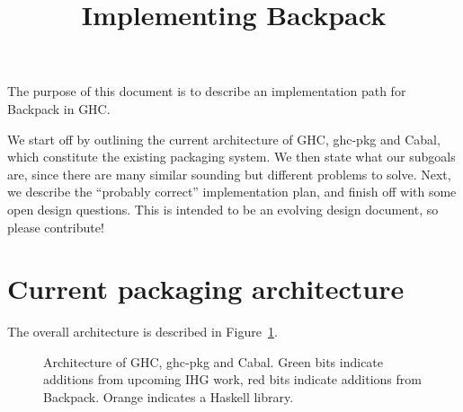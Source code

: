 \documentclass{article}
\title{Implementing Backpack}
\begin{document}
\maketitle

The purpose of this document is to describe an implementation path
for Backpack in GHC\@.

We start off by outlining the current architecture of GHC, ghc-pkg and Cabal,
which constitute the existing packaging system.  We then state what our subgoals
are, since there are many similar sounding but different problems to solve.  Next,
we describe the ``probably correct'' implementation plan, and finish off with
some open design questions.  This is intended to be an evolving design document,
so please contribute!

\section{Current packaging architecture}

The overall architecture is described in Figure~\ref{fig:arch}.

\begin{figure}[H]
\label{fig:arch}\caption{Architecture of GHC, ghc-pkg and Cabal. Green bits indicate additions from upcoming IHG work, red bits indicate additions from Backpack.  Orange indicates a Haskell library.}
\end{figure}
\end{document}
